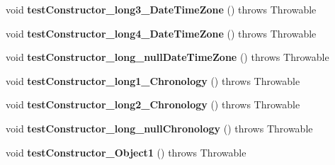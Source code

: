 \begin{DoxyCompactItemize}
\item 
\hypertarget{classorg_1_1joda_1_1time_1_1_test_local_date___constructors_af5934c8846bd08e4d6df13281bad7381}{void {\bfseries test\-Constructor\-\_\-long3\-\_\-\-Date\-Time\-Zone} ()  throws Throwable }\label{classorg_1_1joda_1_1time_1_1_test_local_date___constructors_af5934c8846bd08e4d6df13281bad7381}

\item 
\hypertarget{classorg_1_1joda_1_1time_1_1_test_local_date___constructors_abe8141c65483d72c50dde00d58968808}{void {\bfseries test\-Constructor\-\_\-long4\-\_\-\-Date\-Time\-Zone} ()  throws Throwable }\label{classorg_1_1joda_1_1time_1_1_test_local_date___constructors_abe8141c65483d72c50dde00d58968808}

\item 
\hypertarget{classorg_1_1joda_1_1time_1_1_test_local_date___constructors_a7faaf82f4d8f9390f62cab6573988f6d}{void {\bfseries test\-Constructor\-\_\-long\-\_\-null\-Date\-Time\-Zone} ()  throws Throwable }\label{classorg_1_1joda_1_1time_1_1_test_local_date___constructors_a7faaf82f4d8f9390f62cab6573988f6d}

\item 
\hypertarget{classorg_1_1joda_1_1time_1_1_test_local_date___constructors_a624a0c31ac492ca55dd17dc87091f525}{void {\bfseries test\-Constructor\-\_\-long1\-\_\-\-Chronology} ()  throws Throwable }\label{classorg_1_1joda_1_1time_1_1_test_local_date___constructors_a624a0c31ac492ca55dd17dc87091f525}

\item 
\hypertarget{classorg_1_1joda_1_1time_1_1_test_local_date___constructors_acae610be0f11b910be08ebac3b22d2c9}{void {\bfseries test\-Constructor\-\_\-long2\-\_\-\-Chronology} ()  throws Throwable }\label{classorg_1_1joda_1_1time_1_1_test_local_date___constructors_acae610be0f11b910be08ebac3b22d2c9}

\item 
\hypertarget{classorg_1_1joda_1_1time_1_1_test_local_date___constructors_ab0b6ade63384bfb4f5d8a7b6ae27225b}{void {\bfseries test\-Constructor\-\_\-long\-\_\-null\-Chronology} ()  throws Throwable }\label{classorg_1_1joda_1_1time_1_1_test_local_date___constructors_ab0b6ade63384bfb4f5d8a7b6ae27225b}

\item 
\hypertarget{classorg_1_1joda_1_1time_1_1_test_local_date___constructors_aeb3266193dcf6d2b870093fcd974177a}{void {\bfseries test\-Constructor\-\_\-\-Object1} ()  throws Throwable }\label{classorg_1_1joda_1_1time_1_1_test_local_date___constructors_aeb3266193dcf6d2b870093fcd974177a}


\end{DoxyCompactItemize}
